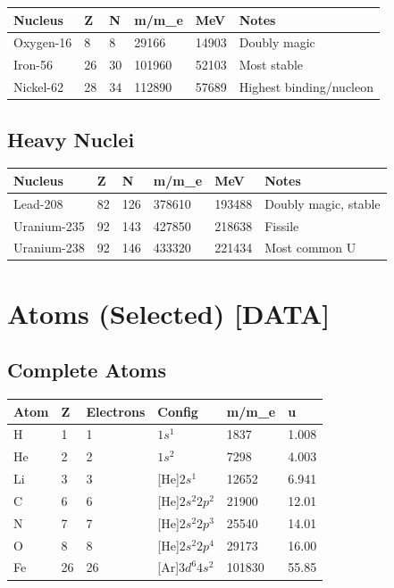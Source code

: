 \documentclass[
  11pt,
  letterpaper,
  twoside,
  openright]{book}
\begin{document}
\begin{longtable}[]{@{}llllll@{}}
\toprule\noalign{}
Nucleus & Z & N & m/m\_e & MeV & Notes \\
\midrule\noalign{}
\endhead
\bottomrule\noalign{}
\endlastfoot
Oxygen-16 & 8 & 8 & 29166 & 14903 & Doubly magic \\
Iron-56 & 26 & 30 & 101960 & 52103 & Most stable \\
Nickel-62 & 28 & 34 & 112890 & 57689 & Highest binding/nucleon \\
\end{longtable}

\subsection{Heavy Nuclei}\label{heavy-nuclei}

\begin{longtable}[]{@{}llllll@{}}
\toprule\noalign{}
Nucleus & Z & N & m/m\_e & MeV & Notes \\
\midrule\noalign{}
\endhead
\bottomrule\noalign{}
\endlastfoot
Lead-208 & 82 & 126 & 378610 & 193488 & Doubly magic, stable \\
Uranium-235 & 92 & 143 & 427850 & 218638 & Fissile \\
Uranium-238 & 92 & 146 & 433320 & 221434 & Most common U \\
\end{longtable}

\section{Atoms (Selected) {[}DATA{]}}\label{atoms-selected-data}

\subsection{Complete Atoms}\label{complete-atoms}

\begin{longtable}[]{@{}llllll@{}}
\toprule\noalign{}
Atom & Z & Electrons & Config & m/m\_e & u \\
\midrule\noalign{}
\endhead
\bottomrule\noalign{}
\endlastfoot
H & 1 & 1 & \(1s^1\) & 1837 & 1.008 \\
He & 2 & 2 & \(1s^2\) & 7298 & 4.003 \\
Li & 3 & 3 & {[}He{]}\(2s^1\) & 12652 & 6.941 \\
C & 6 & 6 & {[}He{]}\(2s^2 2p^2\) & 21900 & 12.01 \\
N & 7 & 7 & {[}He{]}\(2s^2 2p^3\) & 25540 & 14.01 \\
O & 8 & 8 & {[}He{]}\(2s^2 2p^4\) & 29173 & 16.00 \\
Fe & 26 & 26 & {[}Ar{]}\(3d^6 4s^2\) & 101830 & 55.85 \\
\end{longtable}
\end{document}
